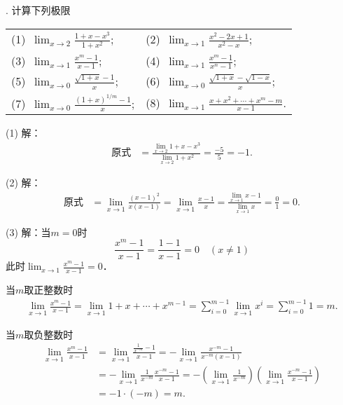 . 计算下列极限
\begin{table}[H]
    \centering
    \begin{tabularx}{\textwidth} {  >{\raggedright\arraybackslash}X >{\raggedright\arraybackslash}X  }
       (1)~$\displaystyle\lim_{x \to 2}\displaystyle\frac{1+x-x^3}{1+x^2}$; & (2)~$\displaystyle\lim_{x \to 1}\displaystyle\frac{x^2-2x+1}{x^2-x}$; \\ [1em]
       (3)~$\displaystyle\lim_{x \to 1}\displaystyle\frac{x^m-1}{x-1}$; & (4)~$\displaystyle\lim_{x \to 1}\displaystyle\frac{x^m-1}{x^n-1}$; \\ [1em]
       (5)~$\displaystyle\lim_{x \to 0}\displaystyle\frac{\sqrt{1+x}-1}{x}$; & (6)~$\displaystyle\lim_{x \to 0}\displaystyle\frac{\sqrt{1+x}-\sqrt{1-x}}{x}$; \\ [1em]
       (7)~$\displaystyle\lim_{x \to 0}\displaystyle\frac{(1+x)^{1/m}-1}{x}$; & (8)~$\displaystyle\lim_{x \to 1}\displaystyle\frac{x+x^2+\cdots+x^m-m}{x-1}$.
      \end{tabularx}
\end{table}

\noindent (1) 解：
\begin{align}
    \text{原式} &= \displaystyle\frac{\displaystyle\lim_{x \to 2} 1+x-x^3}{\displaystyle\lim_{x \to 2} 1+x^2} = \displaystyle\frac{-5}{5} = -1.
\end{align}

\noindent (2) 解：
\begin{align}
    \text{原式} &= \lim_{x \to 1} \displaystyle\frac{(x-1)^2}{x(x-1)} = \lim_{x \to 1} \displaystyle\frac{x-1}{x} = \displaystyle\frac{\displaystyle\lim_{x \to 1} x-1}{\displaystyle\lim_{x \to 1} x} = \frac{0}{1} = 0.
\end{align}

\noindent (3) 解：当$m=0$时
\begin{equation}
    \frac{x^m-1}{x-1} = \frac{1-1}{x-1} = 0 \quad (x \neq 1)
\end{equation}
此时$\displaystyle\lim_{x \to 1} \displaystyle\frac{x^m-1}{x-1}=0$．

\noindent 当$m$取正整数时
\begin{align}
    \lim_{x \to 1}\displaystyle\frac{x^m-1}{x-1} = \displaystyle\lim_{x \to 1} 1+x+\cdots+x^{m-1} = \sum_{i=0}^{m-1} \lim_{x \to 1} x^i = \sum_{i=0}^{m-1} 1 = m.
\end{align}

\noindent 当$m$取负整数时
\begin{align}
    \lim_{x \to 1}\displaystyle\frac{x^m-1}{x-1} &= \lim_{x \to 1} \displaystyle\frac{\displaystyle\frac{1}{x^{-m}}-1}{x-1} = - \lim_{x \to 1} \displaystyle\frac{x^{-m}-1}{x^{-m}(x-1)} \\
    &=- \lim_{x \to 1} \displaystyle\frac{1}{x^{-m}} \frac{x^{-m}-1}{x-1} = -\left( \lim_{x \to 1} \displaystyle\frac{1}{x^{-m}} \right) \left( \lim_{x \to 1} \displaystyle \frac{x^{-m}-1}{x-1} \right) \\
    &= - 1 \cdot (-m)  = m .
\end{align}

